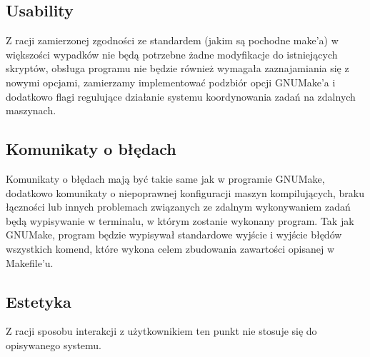 \documentclass[a4paper]{article}
\begin{document}
\subsection{Usability}

Z racji zamierzonej zgodności ze standardem (jakim są pochodne make’a) w większości wypadków nie będą potrzebne żadne modyfikacje do istniejących skryptów, obsługa programu nie będzie również wymagała zaznajamiania się z nowymi opcjami, zamierzamy implementować podzbiór opcji GNUMake’a i dodatkowo flagi regulujące działanie systemu koordynowania zadań na zdalnych maszynach.


\subsection{Komunikaty o błędach}

Komunikaty o błędach mają być takie same jak w programie GNUMake, dodatkowo komunikaty o niepoprawnej konfiguracji maszyn kompilujących, braku łączności lub innych problemach związanych ze zdalnym wykonywaniem zadań będą wypisywanie w terminalu, w którym zostanie wykonany program.
Tak jak GNUMake, program będzie wypisywał standardowe wyjście i wyjście błędów wszystkich komend, które wykona celem zbudowania zawartości opisanej w Makefile’u.


\subsection{Estetyka}

Z racji sposobu interakcji z użytkownikiem ten punkt nie stosuje się do opisywanego systemu.
\end{document}
